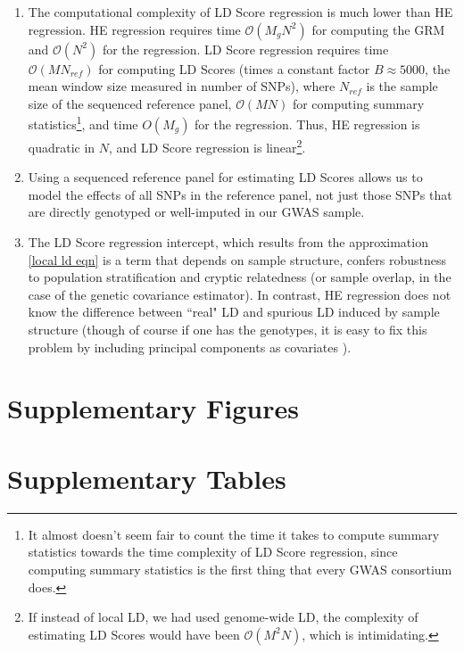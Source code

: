 \documentclass[11pt]{article}
\numberwithin{equation}{section}
\numberwithin{definition}{section}
\numberwithin{thm}{section}
\numberwithin{lemma}{section}
\numberwithin{prop}{section}
\numberwithin{cor}{section}
\numberwithin{hyp}{section}
\begin{document}
\begin{enumerate}
	\item The computational complexity of LD Score regression is much lower than HE regression. HE regression requires time
	$\mathscr{O}(M_gN^2)$ for computing the GRM and $\mathscr{O}(N^2)$ for the regression. LD Score regression requires
	time $\mathscr{O}(MN_{ref})$ for computing LD Scores (times a constant factor $B\approx 5000$,
	the mean window size measured in number of SNPs), where $N_{ref}$ is the sample size of the sequenced reference panel,
	$\mathscr{O}(MN)$ for computing summary statistics\footnote{It almost doesn't seem fair to count the time it takes to compute summary statistics towards the time complexity of LD Score regression, since computing summary statistics is the first thing that every GWAS consortium does.},
	 and time $O(M_g)$ for the regression. 
	Thus, HE regression is quadratic in $N$, and LD Score regression is linear\footnote{If instead of local LD, we had used 
	genome-wide LD, the complexity of estimating LD Scores would have been $\mathscr{O}(M^2N)$, which is intimidating.}. 
	
	\item Using a sequenced reference panel for estimating LD Scores allows us to model the effects of all SNPs in the reference panel,
	not just those SNPs that are directly genotyped or well-imputed in our GWAS sample.
	
	\item The LD Score regression intercept, which results from the approximation \ref{local ld eqn} is a term that depends on sample structure, 
	confers robustness to population stratification and cryptic relatedness (or sample
	overlap, in the case of the genetic covariance estimator). In contrast, HE regression does not know the difference between ``real" 
	LD and spurious LD induced by sample structure (though of course if one has the genotypes, it is easy to fix this problem by including
	principal components as covariates \cite{price2006principal}).
 	
\end{enumerate}


\newpage
\section{Supplementary Figures}
\newpage
\section{Supplementary Tables}
\end{document}
